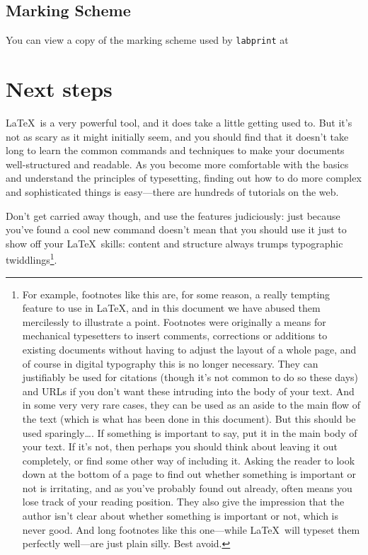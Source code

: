 \begin{refsection}
\begin{demonote}
  \small
  
\end{demonote}

\subsection{Marking Scheme}
\label{section:mark-scheme}
You can view a copy of the marking scheme used by \texttt{labprint} at\\
{\small {}}


\section{Next steps}

\LaTeX\ is a very powerful tool, and it does take a little getting used to. But it's not as scary as it might initially seem, and you should find that it doesn't take long to learn the common commands and techniques to make your documents well-structured and readable. As you become more comfortable with the basics and understand the principles of typesetting, finding out how to do more complex and sophisticated things is easy---there are hundreds of tutorials on the web. 

Don't get carried away though, and use the features judiciously: just because you've found a cool new command doesn't mean that you should use it just to show off your \LaTeX\ skills: content and structure always trumps typographic twiddlings\footnote{For example, footnotes like this are, for some reason, a really tempting feature to use in \LaTeX, and in this document we have abused them mercilessly to illustrate a point. Footnotes were originally a means for mechanical typesetters to insert comments, corrections or additions to existing documents without having to adjust the layout of a whole page, and of course in digital typography this is no longer necessary. They can justifiably be used for citations (though it's not common to do so these days) and URLs if you don't want these intruding into the body of your text. And in some very very rare cases, they can be used as an aside to the main flow of the text (which is what has been done in this document). But this should be used sparingly\ldots. If something is important to say, put it in the main body of your text. If it's not, then perhaps you should think about leaving it out completely, or find some other way of including it. Asking the reader to look down at the bottom of a page to find out whether something is important or not is irritating, and as you've probably found out already, often means you lose track of your reading position. They also give the impression that the author isn't clear about whether something is important or not, which is never good. And long footnotes like this one---while \LaTeX\ will typeset them perfectly well---are just plain silly. Best avoid.}.


\end{refsection}

